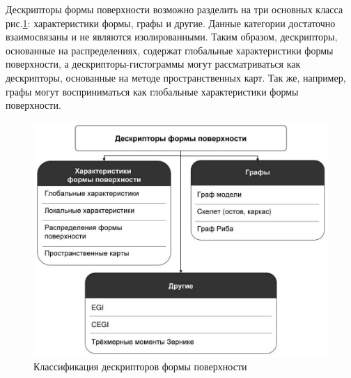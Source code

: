 \documentclass[14pt]{article}
\numberwithin{figure}{section}
\numberwithin{equation}{section}
\begin{document}
%

Дескрипторы формы поверхности возможно разделить на три основных класса рис.\ref{ris:1}: характеристики формы, графы и другие. Данные категории достаточно взаимосвязаны и не являются изолированными. Таким образом, дескрипторы, основанные на распределениях, содержат глобальные характеристики формы поверхности, а дескрипторы-гистограммы могут рассматриваться как дескрипторы, основанные на методе пространственных карт. Так же, например, графы могут восприниматься как глобальные характеристики формы поверхности.

\begin{figure}[h]
	\begin{center}
		\includegraphics[scale=0.46]{1.JPG}
		\caption{Классификация дескрипторов формы поверхности}
		\label{ris:1}
	\end{center}
\end{figure}
\end{document}
